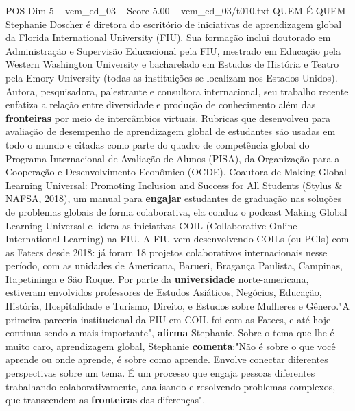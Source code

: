 \begin{textsample}{POS Dim 5 – vem\_ed\_03 – Score 5.00 – vem\_ed\_03/t010.txt}  \label{ex:f5_pos_054}
QUEM É QUEM Stephanie Doscher é diretora do escritório de iniciativas de aprendizagem global da Florida International University (FIU).
Sua formação inclui doutorado em Administração e Supervisão Educacional pela FIU, mestrado em Educação pela Western Washington University e bacharelado em Estudos de História e Teatro pela Emory University (todas as instituições se localizam nos Estados Unidos).
Autora, pesquisadora, palestrante e consultora internacional, seu trabalho recente enfatiza a relação entre diversidade e produção de conhecimento além das \textbf{fronteiras} por meio de intercâmbios virtuais.
Rubricas que desenvolveu para avaliação de desempenho de aprendizagem global de estudantes são usadas em todo o mundo e citadas como parte do quadro de competência global do Programa Internacional de Avaliação de Alunos (PISA), da Organização para a Cooperação e Desenvolvimento Econômico (OCDE).
Coautora de Making Global Learning Universal: Promoting Inclusion and Success for All Students (Stylus \& NAFSA, 2018), um manual para \textbf{engajar} estudantes de graduação nas soluções de problemas globais de forma colaborativa, ela conduz o podcast Making Global Learning Universal e lidera as iniciativas COIL (Collaborative Online International Learning) na FIU.
A FIU vem desenvolvendo COILs (ou PCIs) com as Fatecs desde 2018: já foram 18 projetos colaborativos internacionais nesse período, com as unidades de Americana, Barueri, Bragança Paulista, Campinas, Itapetininga e São Roque.
Por parte da \textbf{universidade} norte-americana, estiveram envolvidos professores de Estudos Asiáticos, Negócios, Educação, História, Hospitalidade e Turismo, Direito, e Estudos sobre Mulheres e Gênero."A primeira parceria institucional da FIU em COIL foi com as Fatecs, e até hoje continua sendo a mais importante", \textbf{afirma} Stephanie.
Sobre o tema que lhe é muito caro, aprendizagem global, Stephanie \textbf{comenta}:"Não é sobre o que você aprende ou onde aprende, é sobre como aprende.
Envolve conectar diferentes perspectivas sobre um tema.
É um processo que engaja pessoas diferentes trabalhando colaborativamente, analisando e resolvendo problemas complexos, que transcendem as \textbf{fronteiras} das diferenças".

\end{textsample}
